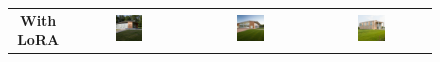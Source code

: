 \begin{figure}[H]
  \centering
  {\footnotesize
  \renewcommand{\arraystretch}{1.1}
  \setlength{\tabcolsep}{4pt}
  \begin{tabular}{c c c c}
    \textbf{With LoRA} &
    \includegraphics[width=0.25\textwidth]{Images/Results/Architect-B_unstructured-phase/generated_images/5/Met_lora_00028_.png} &
    \includegraphics[width=0.25\textwidth]{Images/Results/Architect-B_unstructured-phase/generated_images/5/Met_lora_00029_.png} &
    \includegraphics[width=0.25\textwidth]{Images/Results/Architect-B_unstructured-phase/generated_images/5/Met_lora_00031_.png} \\


\end{tabular}}
\end{figure}
